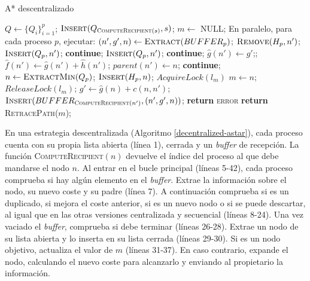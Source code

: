 \documentclass[a4paper,12pt]{article}
\begin{document}
\begin{algorithm}[H]
\caption{A* descentralizado}\label{decentralized-astar}
\begin{algorithmic}[1]
\State $Q \gets \{Q_i\}_{i=1}^p$;
\State $\textsc{Insert}(Q_{\textsc{ComputeRecipient}(s)}, s)$;
\State $m \gets$ NULL;
\State En paralelo, para cada proceso $p$, ejecutar:
        \State $(n', g', n) \gets \textsc{Extract}(BUFFER_p)$;
                \State $\textsc{Remove}(H_p, n')$;
                \State $\textsc{Insert}(Q_p, n')$;
            \Else
                \State \textbf{continue};
            \EndIf
        \Else
                \State $\textsc{Insert}(Q_p, n')$;
                \State \textbf{continue};
            \EndIf
        \EndIf
        \State $\hat{g}(n') \gets g'$;;
        \State $\hat{f}(n') \gets \hat{g}(n') + \hat{h}(n')$;
        \State $parent(n') \gets n$;
    \EndWhile
        \State \textbf{continue};
    \EndIf
    \State $n \gets \textsc{ExtractMin}(Q_p)$;
    \State $\textsc{Insert}(H_p, n)$;
        \State $AcquireLock(l_m)$
            \State $m \gets n$;
        \EndIf
        \State $ReleaseLock(l_m)$;
    \EndIf
        \State $g' \gets \hat{g}(n) + c(n, n')$;
        \State $\textsc{Insert}(BUFFER_{\textsc{ComputeRecipient}(n')}, (n', g', n))$;
    \EndFor
\EndWhile
{}
    \State \textbf{return} \textsc{error}
\Else
    \State \textbf{return} \textsc{RetracePath}($m$);
\EndIf
\end{algorithmic}
\end{algorithm}

En una estrategia descentralizada (Algoritmo \ref{decentralized-astar}), cada proceso cuenta con su propia lista abierta (línea 1), cerrada y un \textit{buffer} de recepción. La función \textsc{ComputeRecipient}$(n)$ devuelve el índice del proceso al que debe mandarse el nodo $n$. Al entrar en el bucle principal (líneas 5-42), cada proceso comprueba si hay algún elemento en el \textit{buffer}. Extrae la información sobre el nodo, su nuevo coste y su padre (línea 7). A continuación comprueba si es un duplicado, si mejora el coste anterior, si es un nuevo nodo o si se puede descartar, al igual que en las otras versiones centralizada y secuencial (líneas 8-24). Una vez vaciado el \textit{buffer}, comprueba si debe terminar (líneas 26-28). Extrae un nodo de su lista abierta y lo inserta en su lista cerrada (líneas 29-30). Si es un nodo objetivo, actualiza el valor de $m$ (líneas 31-37). En caso contrario, expande el nodo, calculando el nuevo coste para alcanzarlo y enviando al propietario la información.
\end{document}
